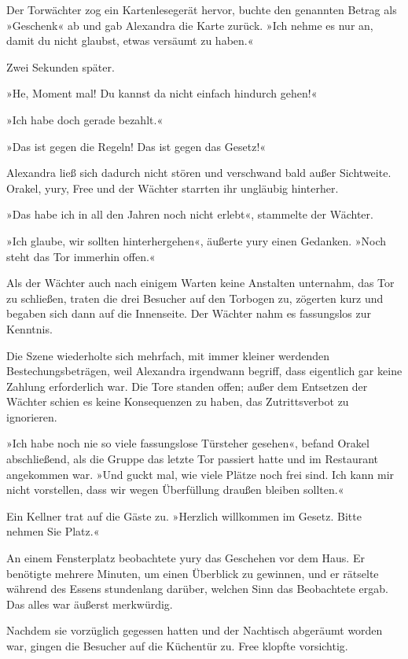 Der Torwächter zog ein Kartenlesegerät hervor, buchte den genannten Betrag als »Geschenk« ab und gab Alexandra die Karte zurück. »Ich nehme es nur an, damit du nicht glaubst, etwas versäumt zu haben.«

Zwei Sekunden später.

»He, Moment mal! Du kannst da nicht einfach hindurch gehen!«

»Ich habe doch gerade bezahlt.«

»Das ist gegen die Regeln! Das ist gegen das Gesetz!«

Alexandra ließ sich dadurch nicht stören und verschwand bald außer Sichtweite. Orakel, yury, Free und der Wächter starrten ihr ungläubig hinterher.

»Das habe ich in all den Jahren noch nicht erlebt«, stammelte der Wächter.

»Ich glaube, wir sollten hinterhergehen«, äußerte yury einen Gedanken. »Noch steht das Tor immerhin offen.«

Als der Wächter auch nach einigem Warten keine Anstalten unternahm, das Tor zu schließen, traten die drei Besucher auf den Torbogen zu, zögerten kurz und begaben sich dann auf die Innenseite. Der Wächter nahm es fassungslos zur Kenntnis.

Die Szene wiederholte sich mehrfach, mit immer kleiner werdenden Bestechungsbeträgen, weil Alexandra irgendwann begriff, dass eigentlich gar keine Zahlung erforderlich war. Die Tore standen offen; außer dem Entsetzen der Wächter schien es keine Konsequenzen zu haben, das Zutrittsverbot zu ignorieren.

»Ich habe noch nie so viele fassungslose Türsteher gesehen«, befand Orakel abschließend, als die Gruppe das letzte Tor passiert hatte und im Restaurant angekommen war. »Und guckt mal, wie viele Plätze noch frei sind. Ich kann mir nicht vorstellen, dass wir wegen Überfüllung draußen bleiben sollten.«

Ein Kellner trat auf die Gäste zu. »Herzlich willkommen im Gesetz. Bitte nehmen Sie Platz.«

An einem Fensterplatz beobachtete yury das Geschehen vor dem Haus. Er benötigte mehrere Minuten, um einen Überblick zu gewinnen, und er rätselte während des Essens stundenlang darüber, welchen Sinn das Beobachtete ergab. Das alles war äußerst merkwürdig.

Nachdem sie vorzüglich gegessen hatten und der Nachtisch abgeräumt worden war, gingen die Besucher auf die Küchentür zu. Free klopfte vorsichtig.

